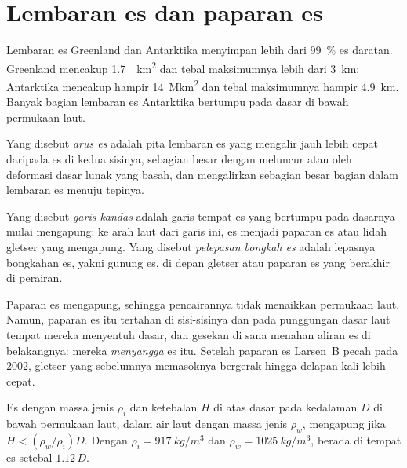 \section{Lembaran es dan paparan es}\label{sec:b3:glaciology:ice-sheets}

Lembaran es Greenland dan Antarktika menyimpan lebih dari
\qty{99}{\percent} es daratan. Greenland mencakup \qty{1.7}{\mega
km^2} dan tebal maksimumnya lebih dari \qty{3}{km}; Antarktika mencakup
hampir \qty{14}{\mega km^2} dan tebal maksimumnya hampir \qty{4.9}{km}. Banyak
bagian lembaran es Antarktika bertumpu pada dasar di bawah permukaan laut.

\begin{definition}[Arus es]\label{def:b3:glaciology:ice-stream}
Yang disebut \emph{arus es} adalah pita lembaran es yang mengalir
jauh lebih cepat daripada es di kedua sisinya, sebagian besar dengan meluncur atau oleh
deformasi dasar lunak yang basah, dan mengalirkan sebagian besar
bagian dalam lembaran es menuju tepinya.
\end{definition}

\begin{definition}\label{def:b3:glaciology:grounding-line}
Yang disebut \emph{garis kandas} adalah garis tempat es
yang bertumpu pada dasarnya mulai mengapung: ke arah laut dari garis ini, es menjadi paparan es
atau lidah gletser yang mengapung. Yang disebut \emph{pelepasan bongkah es} adalah lepasnya
bongkahan es, yakni gunung es, di depan gletser atau paparan es
yang berakhir di perairan.
\end{definition}

Paparan es mengapung, sehingga pencairannya tidak menaikkan permukaan laut. Namun, paparan es itu
tertahan di sisi-sisinya dan pada punggungan dasar laut tempat mereka
menyentuh dasar, dan gesekan di sana menahan aliran es di belakangnya: mereka
\emph{menyangga} es itu. Setelah paparan es Larsen~B pecah pada 2002, gletser
yang sebelumnya memasoknya bergerak hingga delapan kali lebih cepat.

\begin{proposition}[Pengapungan]\label{prop:b3:glaciology:flotation}
Es dengan massa jenis $\rho_i$ dan ketebalan $H$ di atas dasar pada kedalaman $D$ di bawah
permukaan laut, dalam air laut dengan massa jenis $\rho_w$, mengapung jika $H < (\rho_w/\rho_i)D$.
Dengan $\rho_i = \qty{917}{kg/m^3}$ dan $\rho_w = \qty{1025}{kg/m^3}$, 
berada di tempat es setebal $1.12\,D$.
\end{proposition}

